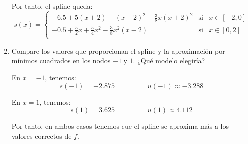 \documentclass[12pt]{article}
\begin{document}
\begin{ejercicio}
\begin{enumerate}
        Por tanto, el spline queda:
        \begin{equation*}
            s(x)=\left\{\begin{array}{lll}
                -6.5 +5(x+2) -(x+2)^2 +\frac{3}{8}x(x+2)^2 & \text{si} & x\in [-2, 0] \\
                -0.5+\frac{5}{2}x + \frac{5}{4}x^2 -\frac{3}{8}x^2(x-2) & \text{si} & x\in [0,2] \\
            \end{array} \right.
        \end{equation*}

        \item Compare los valores que proporcionan el spline y la aproximación por mínimos cuadrados en los nodos $-1$ y $1$. ¿Qué modelo elegiría?

        En $x=-1$, tenemos:
        \begin{equation*}
            s(-1)= -2.875 \hspace{2cm} u(-1)\approx -3.288
        \end{equation*}

        En $x=1$, tenemos:
        \begin{equation*}
            s(1)=3.625 \hspace{2cm} u(1)\approx 4.112
        \end{equation*}

        Por tanto, en ambos casos tenemos que el spline se aproxima más a los valores correctos de $f$.
    \end{enumerate}
\end{ejercicio}


    
\end{document}
